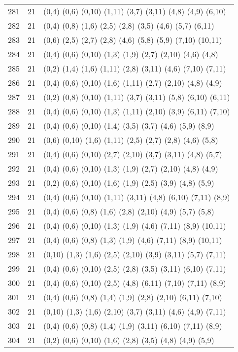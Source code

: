 {\begin{longtable}{lll}
281 & 21 & (0,4) (0,6) (0,10) (1,11) (3,7) (3,11) (4,8) (4,9) (6,10) \\
282 & 21 & (0,4) (0,8) (1,6) (2,5) (2,8) (3,5) (4,6) (5,7) (6,11) \\
283 & 21 & (0,6) (2,5) (2,7) (2,8) (4,6) (5,8) (5,9) (7,10) (10,11) \\
284 & 21 & (0,4) (0,6) (0,10) (1,3) (1,9) (2,7) (2,10) (4,6) (4,8) \\
285 & 21 & (0,2) (1,4) (1,6) (1,11) (2,8) (3,11) (4,6) (7,10) (7,11) \\
286 & 21 & (0,4) (0,6) (0,10) (1,6) (1,11) (2,7) (2,10) (4,8) (4,9) \\
287 & 21 & (0,2) (0,8) (0,10) (1,11) (3,7) (3,11) (5,8) (6,10) (6,11) \\
288 & 21 & (0,4) (0,6) (0,10) (1,3) (1,11) (2,10) (3,9) (6,11) (7,10) \\
289 & 21 & (0,4) (0,6) (0,10) (1,4) (3,5) (3,7) (4,6) (5,9) (8,9) \\
290 & 21 & (0,6) (0,10) (1,6) (1,11) (2,5) (2,7) (2,8) (4,6) (5,8) \\
291 & 21 & (0,4) (0,6) (0,10) (2,7) (2,10) (3,7) (3,11) (4,8) (5,7) \\
292 & 21 & (0,4) (0,6) (0,10) (1,3) (1,9) (2,7) (2,10) (4,8) (4,9) \\
293 & 21 & (0,2) (0,6) (0,10) (1,6) (1,9) (2,5) (3,9) (4,8) (5,9) \\
294 & 21 & (0,4) (0,6) (0,10) (1,11) (3,11) (4,8) (6,10) (7,11) (8,9) \\
295 & 21 & (0,4) (0,6) (0,8) (1,6) (2,8) (2,10) (4,9) (5,7) (5,8) \\
296 & 21 & (0,4) (0,6) (0,10) (1,3) (1,9) (4,6) (7,11) (8,9) (10,11) \\
297 & 21 & (0,4) (0,6) (0,8) (1,3) (1,9) (4,6) (7,11) (8,9) (10,11) \\
298 & 21 & (0,10) (1,3) (1,6) (2,5) (2,10) (3,9) (3,11) (5,7) (7,11) \\
299 & 21 & (0,4) (0,6) (0,10) (2,5) (2,8) (3,5) (3,11) (6,10) (7,11) \\
300 & 21 & (0,4) (0,6) (0,10) (2,5) (4,8) (6,11) (7,10) (7,11) (8,9) \\
301 & 21 & (0,4) (0,6) (0,8) (1,4) (1,9) (2,8) (2,10) (6,11) (7,10) \\
302 & 21 & (0,10) (1,3) (1,6) (2,10) (3,7) (3,11) (4,6) (4,9) (7,11) \\
303 & 21 & (0,4) (0,6) (0,8) (1,4) (1,9) (3,11) (6,10) (7,11) (8,9) \\
304 & 21 & (0,2) (0,6) (0,10) (1,6) (2,8) (3,5) (4,8) (4,9) (5,9) \\

\end{longtable}}
